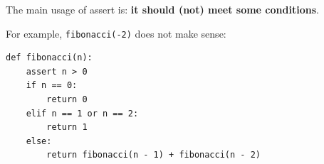 \documentclass[aspectratio=169, 14pt]{beamer}
\begin{document}
\begin{frame}[fragile]
The main usage of \alert{assert} is: \textbf{it should (not) meet some conditions}.

For example, \texttt{fibonacci(-2)} does not make sense:

\begin{verbatim}
def fibonacci(n):
    assert n > 0
    if n == 0:
        return 0
    elif n == 1 or n == 2:
        return 1
    else:
        return fibonacci(n - 1) + fibonacci(n - 2) 
\end{verbatim}  

\end{frame}
\end{document}
